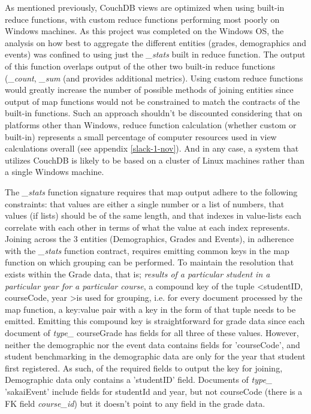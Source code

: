 As mentioned previously, CouchDB views are optimized when using built-in reduce functions, with custom reduce functions performing most poorly on Windows machines. As this project was completed on the Windows OS, the analysis on how best to aggregate the different entities (grades, demographics and events) was confined to using just the \textit{\_stats} built in reduce function. The output of this function overlaps output of the other two built-in reduce functions (\textit{\_count}, \textit{\_sum} (and provides additional metrics). Using custom reduce functions would greatly increase the number of possible methods of joining entities since output of map functions would not be constrained to match the contracts of the built-in functions. Such an approach shouldn't be discounted considering that on platforms other than Windows, reduce function calculation (whether custom or built-in) represents a small percentage of computer resources used in view calculations overall (see appendix \ref{slack-1-nov}). And in any case, a system that utilizes CouchDB is likely to be based on a cluster of Linux machines rather than a single Windows machine.

The \textit{\_stats} function signature requires that map output adhere to the following constraints: that values are either a single number or a list of numbers, that values (if lists) should be of the same length, and that indexes in value-lists each correlate with each other in terms of what the value at each index represents. Joining across the 3 entities (Demographics, Grades and Events), in adherence with the \textit{\_stats} function contract, requires emitting common keys in the map function on which grouping can be performed. To maintain the resolution that exists within the Grade data, that is; \textit{results of a particular student in a particular year for a particular course}, a compound key of the tuple \textless studentID, courseCode, year \textgreater is used for grouping, i.e. for every document processed by the map function, a key:value pair with a key in the form of that tuple needs to be emitted. Emitting this compound key is straightforward for grade data since each document of \textit{type\_} courseGrade has fields for all three of these values. However, neither the demographic nor the event data contains fields for 'courseCode', and student benchmarking in the demographic data are only for the year that student first registered. As such, of the required fields to output the key for joining, Demographic data only contains a 'studentID' field. Documents of \textit{type\_} 'sakaiEvent' include fields for studentId and year, but not courseCode (there is a FK field \textit{course\_id}) but it doesn't point to any field in the grade data.

